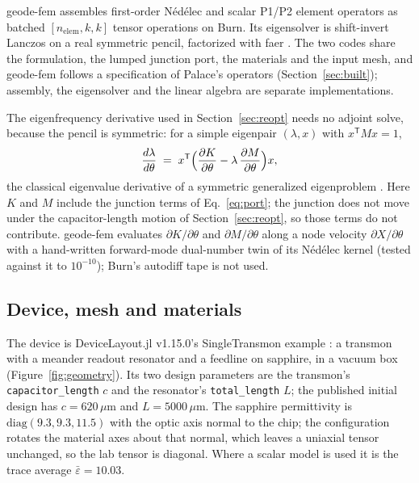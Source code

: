 \documentclass{anvil-paper}
\begin{document}
geode-fem assembles first-order N\'ed\'elec \citep{nedelec1980} and scalar
P1/P2 element operators as batched $[n_{\mathrm{elem}},k,k]$ tensor
operations on Burn. Its eigensolver is shift-invert Lanczos \citep{arpack}
on a real symmetric pencil, factorized with faer \citep{kazdadi2026faer}. The two codes share the
formulation, the lumped junction port, the materials and the input mesh,
and geode-fem follows a specification of Palace's operators
(Section~\ref{sec:built}); assembly, the eigensolver and the linear algebra
are separate implementations.

The eigenfrequency derivative used in Section~\ref{sec:reopt} needs no
adjoint solve, because the pencil is symmetric: for a simple eigenpair
$(\lambda, x)$ with $x^{\mathsf T}Mx = 1$,
\begin{equation}
  \frac{d\lambda}{d\theta} \;=\;
  x^{\mathsf T}\Bigl(\frac{\partial K}{\partial\theta}
  - \lambda\,\frac{\partial M}{\partial\theta}\Bigr)x ,
  \label{eq:hf-eig}
\end{equation}
the classical eigenvalue derivative of a symmetric generalized eigenproblem
\citep{foxkapoor1968rates}. Here $K$ and $M$ include the junction terms of
Eq.~\eqref{eq:port}; the junction does not move under the capacitor-length
motion of Section~\ref{sec:reopt}, so those terms do not contribute.
geode-fem evaluates $\partial K/\partial\theta$ and $\partial
M/\partial\theta$ along a node velocity $\partial X/\partial\theta$ with a
hand-written forward-mode dual-number twin of its N\'ed\'elec kernel
(tested against it to $10^{-10}$); Burn's autodiff tape is not used.

\subsection{Device, mesh and materials}
\label{sec:geometry}

The device is DeviceLayout.jl v1.15.0's SingleTransmon example
\citep{devicelayout}: a transmon \citep{koch2007charge} with a meander readout resonator and a
feedline on sapphire, in a vacuum box (Figure~\ref{fig:geometry}). Its two
design parameters are the transmon's \texttt{capacitor\_length} $c$ and the
resonator's \texttt{total\_length} $L$; the published initial design has
$c = 620\,\mu$m and $L = 5000\,\mu$m. The sapphire permittivity is
$\mathrm{diag}(9.3, 9.3, 11.5)$ with the optic axis normal to the chip;
the configuration rotates the material axes about that normal, which
leaves a uniaxial tensor unchanged, so the lab tensor is diagonal. Where a
scalar model is used it is the trace average $\bar\varepsilon = 10.03$.
\end{document}
